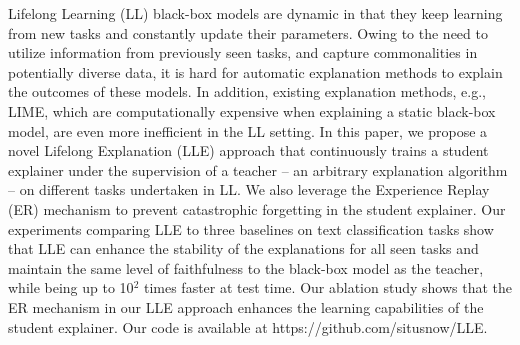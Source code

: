 Lifelong Learning (LL) black-box models are dynamic in that they keep learning from new tasks and constantly update their parameters. Owing to the need to utilize information from previously seen tasks, and capture commonalities in potentially diverse data, it is hard for automatic explanation methods to explain the outcomes of these models. In addition, existing explanation methods, e.g., LIME, which are computationally expensive when explaining a static black-box model, are even more inefficient in the LL setting. In this paper, we propose a novel Lifelong Explanation (LLE) approach that continuously trains a student explainer under the supervision of a teacher -- an arbitrary explanation algorithm -- on different tasks undertaken in LL. We also leverage the Experience Replay (ER) mechanism to prevent catastrophic forgetting in the student explainer. Our experiments comparing LLE to three baselines on text classification tasks show that LLE can enhance the stability of the explanations for all seen tasks and maintain the same level of faithfulness to the black-box model as the teacher, while being up to 10$^2$ times faster at test time. Our ablation study shows that the ER mechanism in our LLE approach enhances the learning capabilities of the student explainer. Our code is available at https://github.com/situsnow/LLE.
